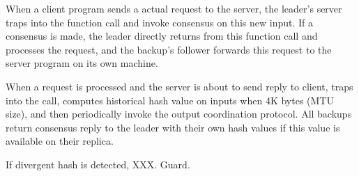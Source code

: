 When a client program sends a actual request to the server, the leader's server 
traps into the \recv function call and invoke consensus on this new input. If 
a consensus is made, the leader directly returns from this function call and 
processes the request, and the backup's follower forwards this request to the 
server program on its own machine.

When a request is processed and the server is about to send reply to client, 
\xxx traps into the \send call, computes historical hash value on inputs when 
4K bytes (MTU size), and then periodically invoke the output coordination 
protocol. All backups return consensus reply to the leader with their own hash 
values if this value is available on their replica.

If divergent hash is detected, XXX. Guard.
